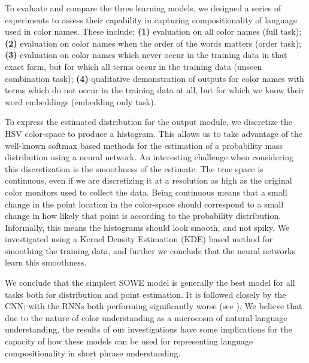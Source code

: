 To evaluate and compare the three learning models, we designed a series of experiments to assess their capability in capturing compositionality of language used in color names.
These include:
\textbf{(1)} evaluation on all color names (full task);
\textbf{(2)} evaluation on  color names when the order of the words matters (order task);
\textbf{(3)} evaluation on color names which never occur in the training data in that exact form, but for which all terms occur in the training data (unseen combination task);
\textbf{(4)} qualitative demonstration of outputs for color names with terms which do not occur in the training data at all, but for which we know their word embeddings (embedding only task).

To express the estimated distribution for the output module, we discretize the HSV color-space to produce a histogram.
This allows us to take advantage of the well-known softmax based methods for the estimation of a probability mass distribution using a neural network.
An interesting challenge when considering this discretization is the smoothness of the estimate.
The true space is continuous, even if we are discretizing it at a resolution as high as the original color monitors used to collect the data.
Being continuous means that a small change in the point location in the color-space should correspond to a small change in how likely that point is according to the probability distribution.
Informally, this means the histograms should look smooth, and not spiky.
We investigated using a Kernel Density Estimation (KDE) based method for smoothing the training data, and further we conclude that the neural networks learn this smoothness.


We conclude that the simplest SOWE model is generally the best model for all tasks both for distribution and point estimation.
It is followed closely by the CNN; with the RNNs both performing significantly worse (see ).
We believe that due to the nature of color understanding as a microcosm of natural language understanding, the results of our investigations have some implications for the capacity of how these models can be used for representing language compositionality in short phrase understanding.
%


